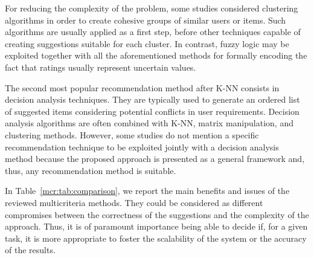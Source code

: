 For reducing the complexity of the problem, some studies considered clustering algorithms in order to create cohesive groups of similar users or items. Such algorithms are usually applied as a first step, before other techniques capable of creating suggestions suitable for each cluster. In contrast, fuzzy logic may be exploited together with all the aforementioned methods for formally encoding the fact that ratings usually represent uncertain values.

The second most popular recommendation method after K-NN consists in decision analysis techniques. They are typically used to generate an ordered list of suggested items considering potential conflicts in user requirements. Decision analysis algorithms are often combined with K-NN, matrix manipulation, and clustering methods. However, some studies do not mention a specific recommendation technique to be exploited jointly with a decision analysis method because the proposed approach is presented as a general framework and, thus, any recommendation method is suitable.

In Table~\ref{mcr:tab:comparison}, we report the main benefits and issues of the reviewed multicriteria methods. They could be considered as different compromises between the correctness of the suggestions and the complexity of the approach. Thus, it is of paramount importance being able to decide if, for a given task, it is more appropriate to foster the scalability of the system or the accuracy of the results.

